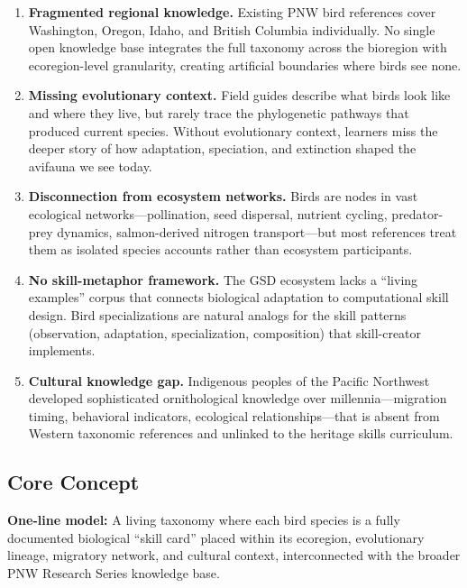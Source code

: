 \documentclass[11pt,letterpaper]{article}
\begin{document}
\begin{enumerate}[leftmargin=2em]
\item \textbf{Fragmented regional knowledge.} Existing PNW bird references cover Washington, Oregon, Idaho, and British Columbia individually. No single open knowledge base integrates the full taxonomy across the bioregion with ecoregion-level granularity, creating artificial boundaries where birds see none.

\item \textbf{Missing evolutionary context.} Field guides describe what birds look like and where they live, but rarely trace the phylogenetic pathways that produced current species. Without evolutionary context, learners miss the deeper story of how adaptation, speciation, and extinction shaped the avifauna we see today.

\item \textbf{Disconnection from ecosystem networks.} Birds are nodes in vast ecological networks---pollination, seed dispersal, nutrient cycling, predator-prey dynamics, salmon-derived nitrogen transport---but most references treat them as isolated species accounts rather than ecosystem participants.

\item \textbf{No skill-metaphor framework.} The GSD ecosystem lacks a ``living examples'' corpus that connects biological adaptation to computational skill design. Bird specializations are natural analogs for the skill patterns (observation, adaptation, specialization, composition) that skill-creator implements.

\item \textbf{Cultural knowledge gap.} Indigenous peoples of the Pacific Northwest developed sophisticated ornithological knowledge over millennia---migration timing, behavioral indicators, ecological relationships---that is absent from Western taxonomic references and unlinked to the heritage skills curriculum.
\end{enumerate}

\subsection{Core Concept}

\textbf{One-line model:} A living taxonomy where each bird species is a fully documented biological ``skill card'' placed within its ecoregion, evolutionary lineage, migratory network, and cultural context, interconnected with the broader PNW Research Series knowledge base.
\end{document}
